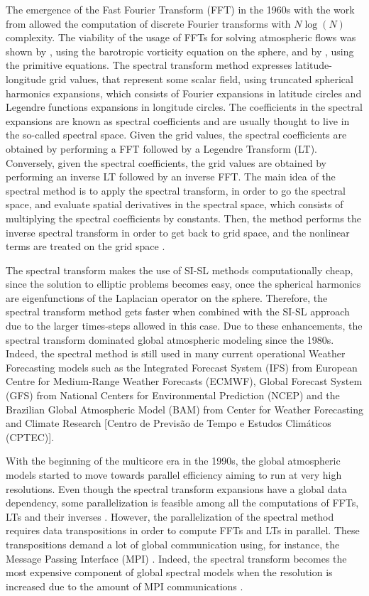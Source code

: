 The emergence of the Fast Fourier Transform (FFT) in the 1960s with the work from 
\citet{cooley:1965} allowed the computation of discrete Fourier transforms with
$N\log(N)$ complexity. 
The viability of the usage of FFTs for solving atmospheric flows was shown by \citet{orszag:1970},
using the barotropic vorticity equation on the sphere, and by \citet{eliasen:1970}, using
the primitive equations.
The spectral transform method expresses latitude-longitude grid values, that represent some scalar field,
using truncated spherical harmonics expansions, which consists of Fourier expansions 
in latitude circles and Legendre functions expansions in longitude circles. 
The coefficients in the spectral expansions are known
as spectral coefficients and are usually thought to live in the so-called spectral space.
Given the grid values, the spectral coefficients are obtained by performing a FFT followed by a 
Legendre Transform (LT). 
Conversely, given the spectral coefficients,
the grid values are obtained by performing an inverse LT followed by an inverse FFT.
The main idea of the spectral method is to apply the spectral transform, in order to 
go the spectral space, and evaluate spatial derivatives in the spectral space, which
consists of multiplying the spectral coefficients by constants. 
Then, the method performs the inverse spectral transform
in order to get back to grid space, and the nonlinear terms are treated on the grid space
\citep{krishnamurti:2006}.

The spectral transform makes the use of SI-SL methods computationally cheap, 
since the solution to elliptic problems becomes easy, once the spherical harmonics are
eigenfunctions of the Laplacian operator on the sphere.
Therefore, the spectral transform method gets faster when combined with the SI-SL approach
due to the larger times-steps allowed in this case.
Due to these enhancements, the spectral transform dominated global atmospheric modeling 
\citep{randall:2018} since the 1980s.
Indeed, the spectral method is still used in many current operational Weather Forecasting models such as
the Integrated Forecast System (IFS) from  European Centre for Medium-Range Weather Forecasts (ECMWF),
Global Forecast System (GFS) from National Centers for Environmental Prediction (NCEP) and the
Brazilian Global Atmospheric Model (BAM) \citep{figueroa:2016} from  Center for Weather Forecasting 
and Climate Research [Centro de Previsão de Tempo e Estudos Climáticos (CPTEC)].

With the beginning of the multicore era in the 1990s, the global atmospheric models
started to move towards parallel efficiency aiming to run at very high resolutions. 
Even though the spectral transform expansions have a global data dependency, some parallelization
is feasible among all the computations of FFTs, LTs and their inverses \citep{barros:1995}.
However, the parallelization of the spectral method requires data transpositions in order
to compute FFTs and LTs in parallel.  
These transpositions demand a lot of global communication using, for instance,
the Message Passing Interface (MPI) \citep{zheng:2018}. 
Indeed, the spectral transform becomes the most expensive component of global spectral models
when the resolution is increased due to the amount of MPI communications \citep{mueller:2019}.


